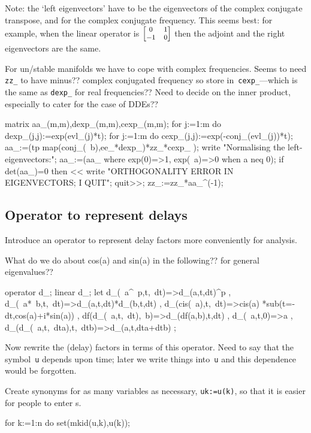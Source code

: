 \documentclass[11pt,a5paper]{article}
\begin{document}
Note: the `left eigenvectors' have to be the eigenvectors of the complex conjugate transpose, and for the complex conjugate frequency.
This seems best: for example, when the linear operator is \(\footnotesize\begin{bmatrix} 0&1\\-1&0 \end{bmatrix}\) then the adjoint and the right eigenvectors are the same.

For un/stable manifolds we have to cope with complex frequencies.  
Seems to need \verb|zz_| to have minus?? complex conjugated frequency so store in~\verb|cexp_|---which is the same as \verb|dexp_| for real frequencies??  Need to decide on the inner product, especially to cater for the case of DDEs??

\begin{reduce}
matrix aa_(m,m),dexp_(m,m),cexp_(m,m);
for j:=1:m do dexp_(j,j):=exp(evl_(j)*t);
for j:=1:m do cexp_(j,j):=exp(-conj_(evl_(j))*t);
aa_:=(tp map(conj_(~b),ee_*dexp_)*zz_*cexp_ );
write "Normalising the left-eigenvectors:";
aa_:=(aa_ where {exp(0)=>1, exp(~a)=>0 when a neq 0});
if det(aa_)=0 then << write
    "ORTHOGONALITY ERROR IN EIGENVECTORS; I QUIT"; quit>>;
zz_:=zz_*aa_^(-1);
\end{reduce}


\subsection{Operator to represent delays}

Introduce an operator to represent delay factors more conveniently for analysis.

What do we do about cos(a) and sin(a) in the following?? for general eigenvalues??

\begin{reduce}
operator d_; linear d_;
let { d_(~a^~p,t,~dt)=>d_(a,t,dt)^p
    , d_(~a*~b,t,~dt)=>d_(a,t,dt)*d_(b,t,dt)
    , d_(cis(~a),t,~dt)=>cis(a)
        *sub(t=-dt,cos(a)+i*sin(a))
    , df(d_(~a,t,~dt),~b)=>d_(df(a,b),t,dt)
    , d_(~a,t,0)=>a
    , d_(d_(~a,t,~dta),t,~dtb)=>d_(a,t,dta+dtb)
    };
\end{reduce}

Now rewrite the (delay) factors in terms of this operator.
Need to say that the symbol~\verb|u| depends upon time; later we write things into~\verb|u| and this dependence would be forgotten.

Create synonyms for as many variables as necessary, \verb|uk:=u(k)|, so that it is easier for people to enter \ode{}s. 
\begin{reduce}
for k:=1:n do set(mkid(u,k),u(k));
\end{reduce}
\end{document}
